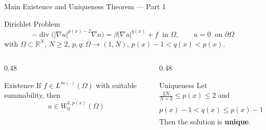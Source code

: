 \documentclass[11pt]{beamer}
\let\oldcite\cite
\renewcommand{\cite}[1]{\textcolor{red}{\textbf{\oldcite{#1}}}}
\begin{document}
	\begin{frame}{Main Existence and Uniqueness Theorem — Part 1 \cite{BrahimiHellal2026}}
		\begin{block}{Dirichlet Problem}
			\small
			\[
			-\operatorname{div}\big(|\nabla u|^{p(x)-2}\nabla u\big) = \beta |\nabla u|^{q(x)} + f \ \text{ in } \Omega, \qquad u = 0 \ \text{ on } \partial\Omega
			\]
			with $\Omega \subset \mathbb{R}^N$, $N \ge 2$, $p, q: \overline{\Omega} \to (1, N)$, $p(x) - 1 < q(x) < p(x)$.
		\end{block}
		
		\begin{columns}[T]
			\begin{column}{0.48\textwidth}
				\begin{block}{Existence}
					\small
					If $f \in L^{m(\cdot)}(\Omega)$ with suitable summability, then
					\[
					u \in W_0^{1, p(x)}(\Omega)
					\]
				\end{block}
			\end{column}
			
			\begin{column}{0.48\textwidth}
				\begin{block}{Uniqueness}
					\small
					Let $\frac{2N}{N+2} \le p(x) \le 2$ and
					\[
					p(x) - 1 < q(x) \le p(x) - 1 + \frac{p(x)}{N}.
					\]
					Then the solution is \textbf{unique}.
				\end{block}
			\end{column}
		\end{columns}
	\end{frame}
	
\end{document}
